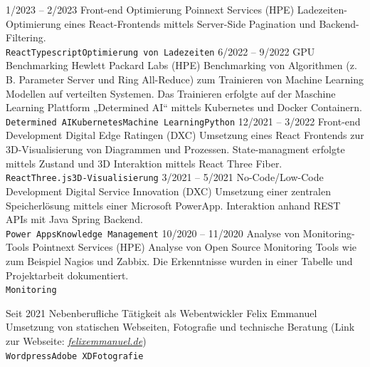 \documentclass[9pt]{developercv} %
\begin{document}
\begin{entrylist}
	\entry
	{1/2023 -- 2/2023}
	{Front-end Optimierung}
	{Poinnext Services (HPE)}
	{Ladezeiten-Optimierung eines React-Frontends mittels Server-Side Pagination und Backend-Filtering.\\ \texttt{React}\slashsep\texttt{Typescript}\slashsep\texttt{Optimierung von Ladezeiten}}
	\entry
	{6/2022 -- 9/2022}
	{GPU Benchmarking}
	{Hewlett Packard Labs (HPE)}
	{Benchmarking von Algorithmen (z. B. Parameter Server und Ring All-Reduce) zum Trainieren von Machine Learning Modellen auf verteilten Systemen. Das Trainieren erfolgte auf der Maschine Learning Plattform „Determined AI“ mittels Kubernetes und Docker Containern. \\ \texttt{Determined AI}\slashsep\texttt{Kubernetes}\slashsep\texttt{Machine Learning}\slashsep\texttt{Python}}
	\entry
	{12/2021 -- 3/2022}
	{Front-end Development}
	{Digital Edge Ratingen (DXC)}
	{Umsetzung eines React Frontends zur 3D-Visualisierung von Diagrammen und Prozessen. State-managment erfolgte mittels Zustand und 3D Interaktion mittels React Three Fiber. \\ \texttt{React}\slashsep\texttt{Three.js}\slashsep\texttt{3D-Visualisierung}}
	\entry
	{3/2021 -- 5/2021}
	{No-Code/Low-Code Development}
	{Digital Service Innovation (DXC)}
	{Umsetzung einer zentralen Speicherlösung mittels einer Microsoft PowerApp. Interaktion anhand REST APIs mit Java Spring Backend. \\ \texttt{Power Apps}\slashsep\texttt{Knowledge Management}}
	\entry
	{10/2020 -- 11/2020}
	{Analyse von Monitoring-Tools}
	{Pointnext Services (HPE)}
	{Analyse von Open Source Monitoring Tools wie zum Beispiel Nagios und Zabbix. Die Erkenntnisse wurden in einer Tabelle und Projektarbeit dokumentiert. \\ \texttt{Monitoring}}
\end{entrylist}

\vspace{0.5cm}

\begin{entrylist}
	\entry
	{Seit 2021}
	{Nebenberufliche Tätigkeit als Webentwickler}
	{Felix Emmanuel}
	{Umsetzung von statischen Webseiten, Fotografie und technische Beratung (Link zur Webseite: \textit{\href{https://felixemmanuel.de}{felixemmanuel.de}}) \\ \texttt{Wordpress}\slashsep\texttt{Adobe XD}\slashsep\texttt{Fotografie}}
\end{entrylist}

\end{document}
